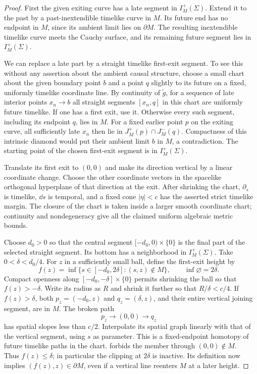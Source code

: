 \begin{proof}
First the given exiting curve has a late segment in
$I_M^+(\Sigma)$.  Extend it to the past by a past-inextendible
timelike curve in $M$.  Its future end has no endpoint in $M$,
since its ambient limit lies on $\partial M$.  The resulting
inextendible timelike curve meets the Cauchy surface, and its
remaining future segment lies in $I_M^+(\Sigma)$.

We can replace a late part by a straight timelike first-exit
segment.  To see this without any assertion about the ambient
causal structure, choose a small chart about the given boundary
point $b$ and a point $q$ slightly to its future on a fixed,
uniformly timelike coordinate line.  By continuity of
$\widetilde g$, for a sequence of late interior points
$x_n\to b$ all straight segments $[x_n,q]$ in this chart are
uniformly future timelike.  If one has a first exit, use it.
Otherwise every such segment, including its endpoint $q$, lies
in $M$.  For a fixed earlier point $p$ on the exiting curve,
all sufficiently late $x_n$ then lie in
$J_M^+(p)\cap J_M^-(q)$.  Compactness of this intrinsic diamond
would put their ambient limit $b$ in $M$, a contradiction.
The starting point of the chosen first-exit segment is in
$I_M^+(\Sigma)$.

Translate its first exit to $(0,0)$ and make its direction
vertical by a linear coordinate change.  Choose the other
coordinate vectors in the spacelike orthogonal hyperplane of
that direction at the exit.  After shrinking the chart,
$\partial_s$ is timelike, $\dd s$ is temporal, and a fixed cone
$|\eta|<c$ has the asserted strict timelike margin.  The closure
of the chart is taken inside a larger smooth coordinate chart;
continuity and nondegeneracy give all the claimed uniform
algebraic metric bounds.

Choose $d_0>0$ so that the central segment
$[-d_0,0)\times\{0\}$ is the final part of the selected straight
segment.  Its bottom has a neighborhood in $I_M^+(\Sigma)$.
Take $0<\delta<d_0/4$.  For $z$ in a sufficiently small ball,
define the first-exit height by
\[
 f(z)=\inf\{s\in[-d_0,2\delta]:(s,z)\notin M\},
 \qquad \inf\varnothing=2\delta.
\]
Compact openness along $[-d_0,-\delta]\times\{0\}$ permits
shrinking the ball so that $f(z)>-\delta$.  Write its radius as
$R$ and shrink it further so that $R/\delta<c/4$.
If $f(z)>\delta$, both $p_z=(-d_0,z)$ and
$q_z=(\delta,z)$, and their entire vertical joining segment,
are in $M$.  The broken path
\[
                p_z\longrightarrow (0,0)\longrightarrow q_z
\]
has spatial slopes less than $c/2$.  Interpolate its spatial
graph linearly with that of the vertical segment, using $s$ as
parameter.  This is a fixed-endpoint homotopy of future timelike
paths in the chart.   forbids the member
through $(0,0)\notin M$.  Thus $f(z)\le\delta$; in particular
the clipping at $2\delta$ is inactive.  Its definition now
implies $(f(z),z)\in\partial M$, even if a vertical line
reenters $M$ at a later height.


\end{proof}
